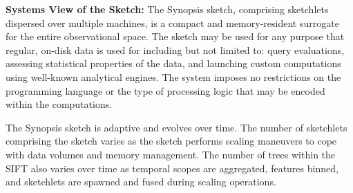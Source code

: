 \textbf{Systems View of the Sketch:} The Synopsis sketch, comprising sketchlets dispersed over multiple machines, is a compact and memory-resident surrogate for the entire observational space. The sketch may be used for any purpose that regular, on-disk data is used for including but not limited to: query evaluations, assessing statistical properties of the data, and launching custom computations using well-known analytical engines. The system imposes no restrictions on the programming language or the type of processing logic that may be encoded within the computations. 

The Synopsis sketch is adaptive and evolves over time. The number of sketchlets comprising the sketch varies as the sketch performs scaling maneuvers to cope with data volumes and memory management. The number of trees within the SIFT  also varies over time as temporal scopes are aggregated, features binned, and sketchlets are spawned and fused during scaling operations.
